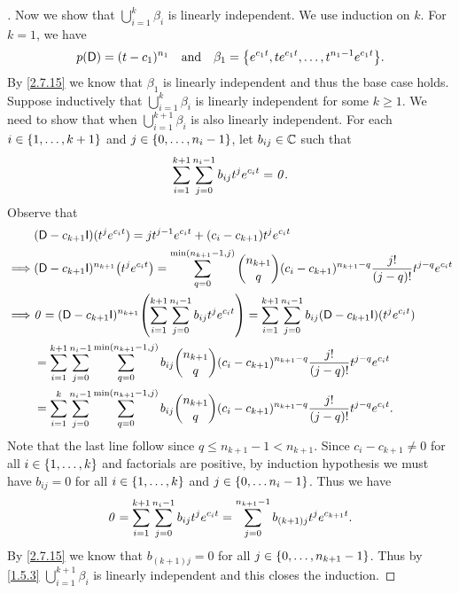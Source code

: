 \begin{proof}[]
  Now we show that \(\bigcup_{i = 1}^k \beta_i\) is linearly independent.
  We use induction on \(k\).
  For \(k = 1\), we have
  \[
    p(\Dop) = (t - c_1)^{n_1} \quad \text{and} \quad \beta_1 = \set{e^{c_1 t}, t e^{c_1 t}, \dots, t^{n_1 - 1} e^{c_1 t}}.
  \]
  By \cref{2.7.15} we know that \(\beta_1\) is linearly independent and thus the base case holds.
  Suppose inductively that \(\bigcup_{i = 1}^k \beta_i\) is linearly independent for some \(k \geq 1\).
  We need to show that when \(\bigcup_{i = 1}^{k + 1} \beta_i\) is also linearly independent.
  For each \(i \in \left\lbrace1, \dots, k + 1\right\rbrace\) and \(j \in \left\lbrace0, \dots, n_i - 1\right\rbrace\), let \(b_{i j} \in \mathbb{C}\) such that
  \[
    \sum_{i = 1}^{k + 1} \sum_{j = 0}^{n_i - 1} b_{i j} t^j e^{c_i t} = \mathit{0}.
  \]
  Observe that
  \begin{align*}
             & (\Dop - c_{k + 1} \IT)(t^j e^{c_i t}) = j t^{j - 1} e^{c_i t} + (c_i - c_{k + 1}) t^j e^{c_i t}                                                                                                             \\
    \implies & (\Dop - c_{k + 1} \IT)^{n_{k + 1}} \pa{t^j e^{c_i t}} = \sum_{q = 0}^{\min(n_{k + 1} - 1, j)} \binom{n_{k + 1}}{q} (c_i - c_{k + 1})^{n_{k + 1} - q} \dfrac{j!}{(j - q)!} t^{j - q} e^{c_i t}               \\
    \implies & \zv = (\Dop - c_{k + 1} \IT)^{n_{k + 1}} \pa{\sum_{i = 1}^{k + 1} \sum_{j = 0}^{n_i - 1} b_{i j} t^j e^{c_i t}} = \sum_{i = 1}^{k + 1} \sum_{j = 0}^{n_i - 1} b_{i j} (\Dop - c_{k + 1} \IT)(t^j e^{c_i t}) \\
             & = \sum_{i = 1}^{k + 1} \sum_{j = 0}^{n_i - 1} \sum_{q = 0}^{\min(n_{k + 1} - 1, j)} b_{i j} \binom{n_{k + 1}}{q} (c_i - c_{k + 1})^{n_{k + 1} - q} \dfrac{j!}{(j - q)!} t^{j - q} e^{c_i t}                 \\
             & = \sum_{i = 1}^k \sum_{j = 0}^{n_i - 1} \sum_{q = 0}^{\min(n_{k + 1} - 1, j)} b_{i j} \binom{n_{k + 1}}{q} (c_i - c_{k + 1})^{n_{k + 1} - q} \dfrac{j!}{(j - q)!} t^{j - q} e^{c_i t}.
  \end{align*}
  Note that the last line follow since \(q \leq n_{k + 1} - 1 < n_{k + 1}\).
  Since \(c_i - c_{k + 1} \neq 0\) for all \(i \in \left\lbrace1, \dots, k\right\rbrace\) and factorials are positive, by induction hypothesis we must have \(b_{i j} = 0\) for all \(i \in \left\lbrace1, \dots, k\right\rbrace\) and \(j \in \left\lbrace0, \dots n_i - 1\right\rbrace\).
  Thus we have
  \[
    \mathit{0} = \sum_{i = 1}^{k + 1} \sum_{j = 0}^{n_i - 1} b_{i j} t^j e^{c_i t} = \sum_{j = 0}^{n_{k + 1} - 1} b_{(k + 1) j} t^j e^{c_{k + 1} t}.
  \]
  By \cref{2.7.15} we know that \(b_{(k + 1) j} = 0\) for all \(j \in \left\lbrace0, \dots, n_{k + 1} - 1\right\rbrace\).
  Thus by \cref{1.5.3} \(\bigcup_{i = 1}^{k + 1} \beta_i\) is linearly independent and this closes the induction.
\end{proof}

